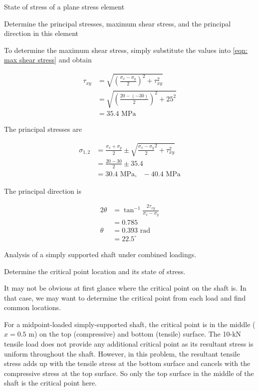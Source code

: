 \documentclass[a4paper,openany,12pt]{book}
\begin{document}
State of stress of a plane stress element

Determine the principal stresses, maximum shear stress, and the
principal direction in this element


To determine the maximum shear stress, simply substitute the values into
\ref{eqn: max shear stress} and obtain

$$\begin{aligned}
      \tau_{xy} &= \sqrt {\left( \frac{\sigma_x - \sigma_y}{2} \right)^2 + \tau _{xy}^2}  \\ 
      &= \sqrt {\left( \frac{20 - ( - 30)}{2} \right)^2 + 25^2}  \\ 
      &= 35.4\text{ MPa}
    \end{aligned}$$

The principal stresses are

$$\begin{aligned}
      \sigma_{1,2} &= \frac{\sigma_x + \sigma_y}{2} \pm \sqrt {\frac{\sigma_x - \sigma_y}{2}^2 + \tau _{xy}^2}  \\ 
      &= \frac{20 - 30}{2} \pm 35.4 \\ 
      &= 30.4\text{ MPa}, \text{ } - 40.4\text{ MPa}
    \end{aligned}$$

The principal direction is

$$\begin{aligned}
      2\theta & = \tan^{-1}\frac{2\tau_{xy}}{\sigma_x - \sigma_y} \\ 
      &= 0.785 \\ 
      \theta  &= 0.393\text{ rad} \\ 
      &= 22.5^{\circ}
    \end{aligned}$$

Analysis of a simply supported shaft under combined loadings.


Determine the critical point location and its state of stress.

It may not be obvious at first glance where the critical point on the
shaft is. In that case, we may want to determine the critical point from
each load and find common locations.

For a midpoint-loaded simply-supported shaft, the critical point is in
the middle (\(x = 0.5\) m) on the top (compressive) and bottom (tensile)
surface. The 10-kN tensile load does not provide any additional critical
point as its resultant stress is uniform throughout the shaft. However,
in this problem, the resultant tensile stress adds up with the tensile
stress at the bottom surface and cancels with the compressive stress at
the top surface. So only the top surface in the middle of the shaft is
the critical point here.
\end{document}
